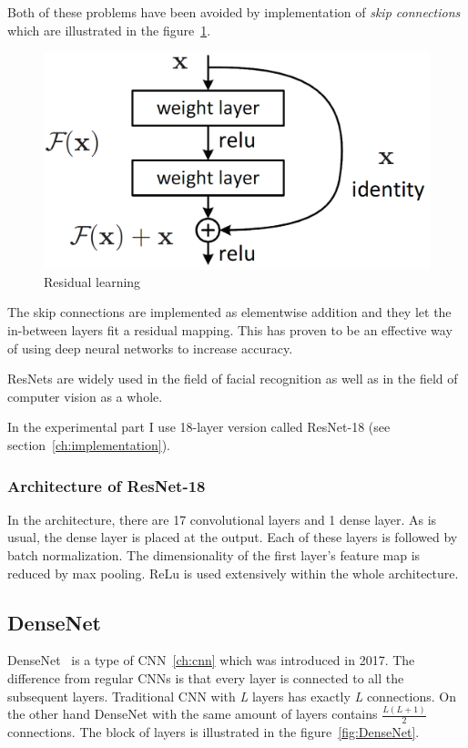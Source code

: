 Both of these problems have been avoided by implementation of \textit{skip connections} which are illustrated in the
figure~\ref{fig:ResNet}.

\begin{figure}[H]
    \centering
    \includegraphics[width=0.9\columnwidth]{images/face-recognition/resnet.png}
    \caption{Residual learning~\cite{ResNet}}
    \label{fig:ResNet}
\end{figure}

The skip connections are implemented as elementwise addition and they let the in-between layers fit a residual mapping.
This has proven to be an effective way of using deep neural networks to increase accuracy.

ResNets are widely used in the field of facial recognition as well as in the field of computer vision as a whole.

In the experimental part I use 18-layer version called ResNet-18 (see section~\ref{ch:implementation}).

\subsubsection{Architecture of ResNet-18}\label{subsubsec:resnet18}
In the architecture, there are 17 convolutional layers and 1 dense layer.
As is usual, the dense layer is placed at the output.
Each of these layers is followed by batch normalization.
The dimensionality of the first layer's feature map is reduced by max pooling.
ReLu is used extensively within the whole architecture.

\subsection{DenseNet}\label{subsec:densenet}
DenseNet~\cite{DenseNet} is a type of CNN~\ref{ch:cnn} which was introduced in 2017.
The difference from regular CNNs is that every layer is connected to all the subsequent layers.
Traditional CNN with \textit{L} layers has exactly \textit{L} connections.
On the other hand DenseNet with the same amount of layers contains $\frac{L\left( L+1 \right)}{2}$ connections.
The block of layers is illustrated in the figure~\ref{fig:DenseNet}.

